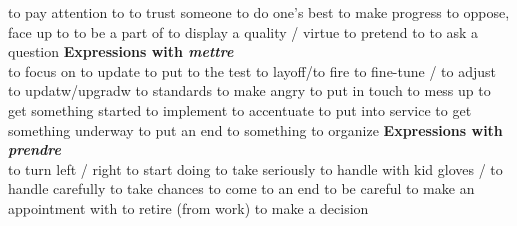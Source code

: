         {to pay attention to}
        {to trust someone}
        {to do one’s best}
        {to make progress}
        {to oppose, face up to}
        {to be a part of}
        {to display a quality / virtue}
        {to pretend to}
        {to ask a question}
     {\bf Expressions with {\em mettre}}\\
        {to focus on}
        {to update}
        {to put to the test}
        {to layoff/to fire}
        {to fine-tune / to adjust}
      {to updatw/upgradw to standards}
        {to make angry}
        {to put in touch}
        {to mess up}
        {to get something started}
        {to implement}
        {to accentuate}
        {to put into service}
        {to get something underway}
        {to put an end to something}
        {to organize}
     {\bf Expressions with {\em prendre}}\\
        {to turn left / right}
        {to start doing}
        {to take seriously}
        {to handle with kid gloves / to handle carefully}
        {to take chances}
        {to come to an end}
        {to be careful}
        {to make an appointment with}
        {to retire (from work)}
        {to make a decision}
